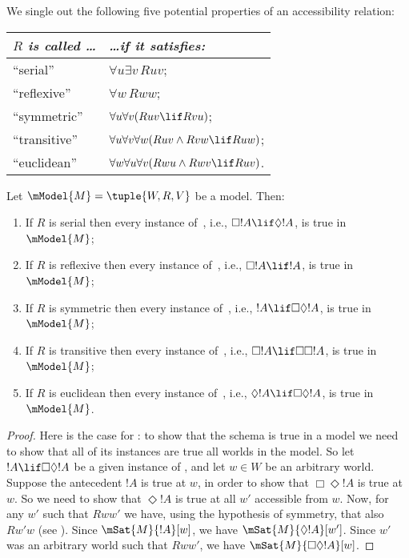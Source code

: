 \documentclass[../../../include/open-logic-section]{subfiles}
\begin{document}


\begin{defn}
  We single out the following five potential properties of an
  accessibility relation:
 \begin{center}
    \begin{tabular}{| l || l |}
      \hline
      {\emph{$R$ is called \dots}} & {\emph{\dots if it satisfies:}} \\
      \hline \hline
      ``serial''   & $\forall u \exists v\, Ruv$; \\
      \hline
      ``reflexive'' & $\forall w \, Rww$; \\
      \hline
      ``symmetric'' & $\forall u\forall v(Ruv \lif Rvu)$; \\
      \hline
      ``transitive'' & $ \forall u \forall v \forall w (Ruv \land Rvw
      \lif Ruw)$; \\
      \hline 
      ``euclidean'' & $ \forall w \forall u \forall v (Rwu \land Rwv
      \lif Ruv)$.\\
      \hline
    \end{tabular}
  \end{center}
\end{defn}

\begin{thm}
  Let $\mModel{M} = \tuple{W, R, V}$ be a model. Then:
 \begin{enumerate}
 \item If $R$ is serial then every instance of~, i.e., $\Box !A \lif
   \Diamond !A$, is true in $\mModel{M}$;
 \item If $R$ is reflexive then every instance of~, i.e., $\Box !A \lif
   !A$, is true in $\mModel{M}$;
 \item If $R$ is symmetric then every instance of~, i.e., $!A \lif
   \Box\Diamond !A$, is true in $\mModel{M}$;
 \item If $R$ is transitive then every instance of~, i.e., $\Box
   !A \lif \Box \Box !A$, is true in $\mModel{M}$;
 \item If $R$ is euclidean then every instance of~, i.e., $\Diamond
   !A \lif \Box \Diamond !A$, is true in $\mModel{M}$.
  \end{enumerate}
\end{thm}

\begin{proof}
  Here is the case for : to show that the schema is true in a
  model we need to show that all of its instances are true all worlds
  in the model. So let $!A \lif \Box\Diamond !A$ be a given instance
  of , and let $w \in W$ be an arbitrary world. Suppose the
  antecedent $!A$ is true at $w$, in order to show that $\Box \Diamond
  !A$ is true at $w$. So we need to show that $\Diamond !A$ is true at
  all $w'$ accessible from $w$. Now, for any $w'$ such that $Rww'$ we
  have, using the hypothesis of symmetry, that also $Rw'w$ (see
  ). Since $\mSat{M}{!A}[w]$, we have
  $\mSat{M}{\Diamond !A}[w']$. Since $w'$ was an arbitrary world such
  that $Rww'$, we have $\mSat{M}{\Box\Diamond!A}[w]$.
\end{proof}
\end{document}

